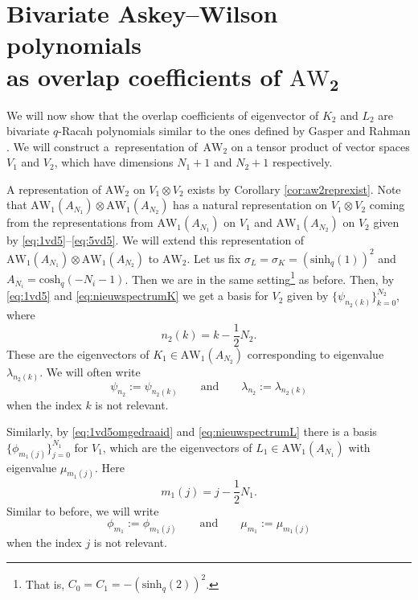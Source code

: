 \documentclass[10pt,a4paper]{amsart}
\numberwithin{equation}{section}
\newcommand{\awc}[2]{\mathrm{AW}_{#1}\!\left(#2\right)}
\newcommand{\AW}[1]{\mathrm{AW}_{#1}}
\newcommand{\chq}{\mathrm{cosh}_q}
\newcommand{\half}{\frac{1}{2}}
\newcommand{\shq}{\mathrm{sinh}_q}
\begin{document}
\section[Bivariate Askey--Wilson polynomials as overlap coefficients of AW\_2]{Bivariate Askey--Wilson polynomials\\ as overlap coefficients of $\boldsymbol{\AW{2}}$}\label{sec:bivarqracah}

We will now show that the overlap coefficients of eigenvector of $K_2$ and $L_2$ are bivariate $q$-Racah polynomials similar to the ones defined by Gasper and Rahman \cite{Gasper2007}. We will construct a~representation of~$\AW{2}$ on a tensor product of vector spaces $V_1$ and $V_2$, which have dimensions $N_1+1$ and $N_2+1$ respectively.

A representation of $\AW{2}$ on $V_1\otimes V_2$ exists by Corollary \ref{cor:aw2reprexist}. Note that $\awc{1}{A_{N_1}}\otimes\awc{1}{A_{N_2}}$ has a natural representation on $V_1\otimes V_2$ coming from the representations from $\awc{1}{A_{N_1}}$ on $V_1$ and $\awc{1}{A_{N_2}}$ on $V_2$ given by \eqref{eq:1vd5}--\eqref{eq:5vd5}. We will extend this representation of $\awc{1}{A_{N_1}}\otimes\awc{1}{A_{N_2}}$ to $\AW{2}$.
Let us fix $\sigma_L=\sigma_K=(\shq(1))^2$ and $A_{N_i}=\chq(-N_i-1)$. Then we are in the same setting\footnote{That is, $C_0=C_1=-(\shq(2))^2$.} as before. Then, by \eqref{eq:1vd5} and \eqref{eq:nieuwspectrumK} we get a basis for $V_2$ given by $\{\psi_{n_2(k)}\}_{k=0}^{N_2}$, where
\[
n_2(k)=k-\half N_2 .
\]
These are the eigenvectors of $K_1\in\awc{1}{A_{N_2}}$ corresponding to eigenvalue $\lambda_{n_2(k)}$. We will often write
\[
\psi_{n_2}:=\psi_{n_2(k)} \qquad \text{and}\qquad \lambda_{n_2}:=\lambda_{n_2(k)}
\]
when the index $k$ is not relevant.

Similarly, by \eqref{eq:1vd5omgedraaid} and \eqref{eq:nieuwspectrumL} there is a basis $\{\phi_{m_1(j)}\}_{j=0}^{N_1}$ for $V_1$, which are the eigenvectors of $L_1\in\awc{1}{A_{N_1}}$ with eigenvalue $\mu_{m_1(j)}$. Here
\[
m_1(j)=j-\half N_1.
\]
Similar to before, we will write
\[
\phi_{m_1}:=\phi_{m_1(j)} \qquad \text{and}\qquad \mu_{m_1}:=\mu_{m_1(j)}
\]
when the index $j$ is not relevant.
\end{document}
